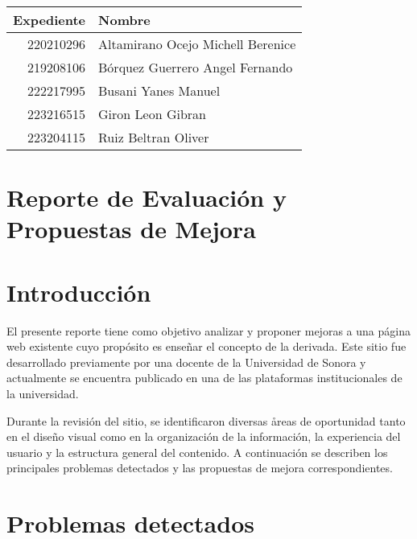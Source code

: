 \documentclass[11pt,a4paper]{article}
\begin{document}
\begin{center}
    \begin{tabular}{r|l}
        \textbf{Expediente} & \textbf{Nombre} \\ \hline
        220210296 & Altamirano Ocejo Michell Berenice \\
        219208106 & Bórquez Guerrero Angel Fernando \\
        222217995 & Busani Yanes Manuel \\
        223216515 & Giron Leon Gibran \\
        223204115 & Ruiz Beltran Oliver
    \end{tabular}
\end{center}

\section*{Reporte de Evaluación y Propuestas de Mejora}
\noindent

\vspace{1em}

\section{Introducci\'on}
El presente reporte tiene como objetivo analizar y proponer mejoras a una p\'agina web existente cuyo prop\'osito es ense\~nar el concepto de la derivada. Este sitio fue desarrollado previamente por una docente de la Universidad de Sonora y actualmente se encuentra publicado en una de las plataformas institucionales de la universidad.

Durante la revisi\'on del sitio, se identificaron diversas \aa reas de oportunidad tanto en el dise\~no visual como en la organizaci\'on de la informaci\'on, la experiencia del usuario y la estructura general del contenido. A continuaci\'on se describen los principales problemas detectados y las propuestas de mejora correspondientes.

\section{Problemas detectados}
\end{document}
